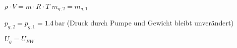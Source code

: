 \( \rho \cdot V = m \cdot R \cdot T \)  
\( m_{g,2} = m_{g,1} \)  

\( p_{g,2} = p_{g,1} = 1.4 \, \text{bar} \) (Druck durch Pumpe und Gewicht bleibt unverändert)  

\( U_g = U_{EW} \)